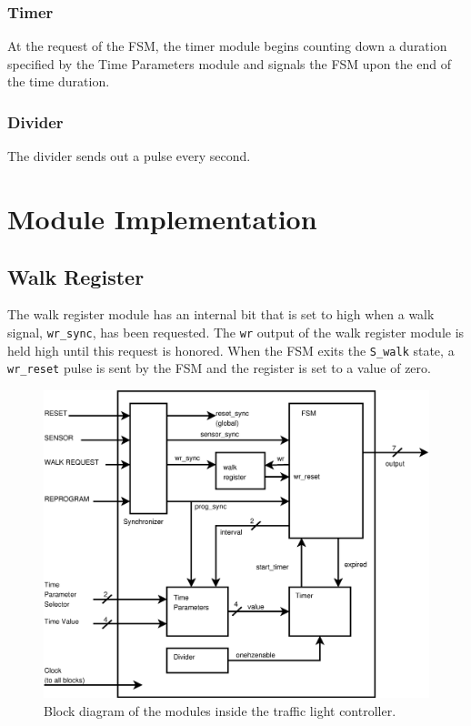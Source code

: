 \documentclass{article}
\begin{document}
		\subsubsection{Timer}
			At the request of the FSM, the timer module begins counting down a
			duration specified by the Time Parameters module and signals the
			FSM upon the end of the time duration.

		\subsubsection{Divider}
			The divider sends out a pulse every second.

\section{Module Implementation}
	\subsection{Walk Register}
		The walk register module has an internal bit that is set to high when a
		walk signal, \texttt{wr\_sync}, has been requested.  The \texttt{wr}
		output of the walk register module is held high until this request is
		honored.  When the FSM exits the \texttt{S\_walk} state, a
		\texttt{wr\_reset} pulse is sent by the FSM and the register is set to
		a value of zero.

	\begin{figure}
	\centering
	\includegraphics[scale=0.25]{block.ps}
	\caption{Block diagram of the modules inside the traffic light controller.}
	\label{fig:block}
	\end{figure}
\end{document}
